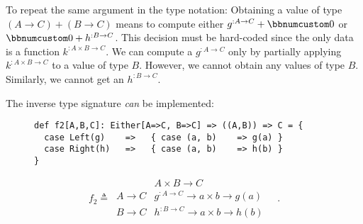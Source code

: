 To repeat the same argument in the type notation: Obtaining a value
of type $(A\rightarrow C)+(B\rightarrow C)$ means to compute either
$g^{:A\rightarrow C}+\bbnum 0$ or $\bbnum 0+h^{:B\rightarrow C}$.
This decision must be hard-coded since the only data is a function
$k^{:A\times B\rightarrow C}$. We can compute a $g^{:A\rightarrow C}$
only by partially applying $k^{:A\times B\rightarrow C}$ to a value
of type $B$. However, we cannot obtain any values of type $B$. Similarly,
we cannot get an $h^{:B\rightarrow C}$.

The inverse type signature \emph{can} be implemented:

\begin{wrapfigure}{l}{0.55\columnwidth}%
\vspace{0.32\baselineskip}
\begin{lstlisting}
def f2[A,B,C]: Either[A=>C, B=>C] => ((A,B)) => C = {
  case Left(g)    =>   { case (a, b)    => g(a) }
  case Right(h)   =>   { case (a, b)    => h(b) }
}
\end{lstlisting}

\vspace{-2.4\baselineskip}
\end{wrapfigure}%
\vspace{-1.2\baselineskip}

\noindent 
\[
f_{2}\triangleq\,\begin{array}{|c||c|}
 & A\times B\rightarrow C\\
\hline A\rightarrow C & g^{:A\rightarrow C}\rightarrow a\times b\rightarrow g(a)\\
B\rightarrow C & h^{:B\rightarrow C}\rightarrow a\times b\rightarrow h(b)
\end{array}\quad.
\]
\vspace{-0.9\baselineskip}

